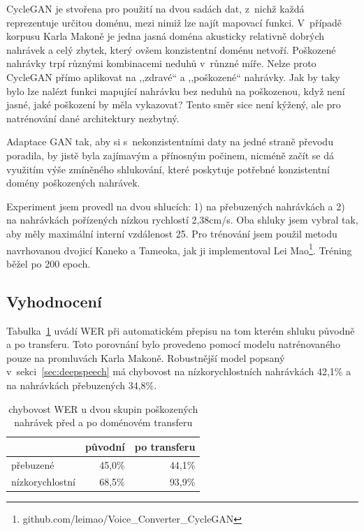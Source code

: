 CycleGAN je stvořena pro použití na dvou sadách dat, z~nichž každá reprezentuje
určitou doménu, mezi nimiž lze najít mapovací funkci. V~případě korpusu Karla
Makoně je jedna jasná doména akusticky relativně dobrých nahrávek a celý zbytek,
který ovšem konzistentní doménu netvoří. Poškozené nahrávky trpí různými
kombinacemi neduhů v~růnzné míře. Nelze proto CycleGAN přímo aplikovat na
,,zdravé`` a ,,poškozené`` nahrávky. Jak by taky bylo lze nalézt funkci mapující
nahrávku bez neduhů na poškozenou, když není jasné, jaké poškození by měla
vykazovat? Tento směr sice není kýžený, ale pro natrénování dané architektury
nezbytný.

Adaptace GAN tak, aby si s~nekonzistentními daty na jedné straně převodu
poradila, by jistě byla zajímavým a přínosným počinem, nicméně začít se dá
využitím výše zmíněného shlukování, které poskytuje potřebné konzistentní
domény poškozených nahrávek.

Experiment jsem provedl na dvou shlucích: 1) na přebuzených nahrávkách a 2) na
nahrávkách pořízených nízkou rychlostí 2,38cm/s. Oba shluky jsem vybral tak, aby
měly maximální interní vzdálenost 25. Pro trénování jsem použil metodu
navrhovanou dvojicí Kaneko a Tameoka\cite{kaneko2017parallel}, jak ji
implementoval Lei Mao\footnote{github.com/leimao/Voice\_Converter\_CycleGAN}.
Tréning běžel po 200 epoch.

\subsection{Vyhodnocení}
\label{sec:akustika:vyhodnoceni}

Tabulka~\ref{tab:ganeval} uvádí WER při automatickém přepisu na tom kterém
shluku původně a po transferu. Toto porovnání bylo provedeno pomocí modelu
natrénovaného pouze na promluvách Karla Makoně. Robustnější model popsaný
v~sekci~\ref{sec:deepspeech} má chybovost na nízkorychlostních nahrávkách
42,1\% %
a na nahrávkách přebuzených 34,8\%. %

\begin{table}[htpb]
\begin{center}
\begin{tabular}{|l||r|r|}
\hline
                 & původní & po transferu \\
\hline
přebuzené        & 45,0\%  & 44,1\% \\
nízkorychlostní  & 68,5\%  & 93,9\% \\
\hline
\end{tabular}
\caption{chybovost WER u dvou skupin poškozených nahrávek před a po doménovém
transferu}\label{tab:ganeval}
\end{center}
\end{table}

